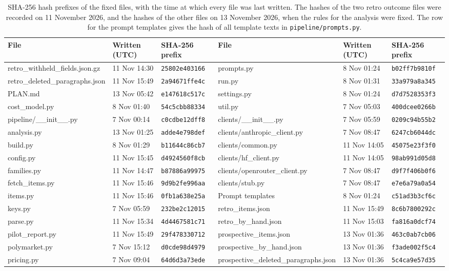 \documentclass[11pt]{article}
\begin{document}
\begin{table}[t]
\centering
\scriptsize
\setlength{\tabcolsep}{3pt}
\begin{tabular}{llllll}
\toprule
File & Written (UTC) & SHA-256 prefix & File & Written (UTC) & SHA-256 prefix \\
\midrule
retro\_withheld\_fields.json.gz & 11 Nov 14:30 & \texttt{25802e403166} & prompts.py & 8 Nov 01:24 & \texttt{b02ff7b9810f} \\
retro\_deleted\_paragraphs.json & 11 Nov 15:49 & \texttt{2a94671ffe4c} & run.py & 8 Nov 01:31 & \texttt{33a979a8a345} \\
PLAN.md & 13 Nov 05:42 & \texttt{e147618c517c} & settings.py & 8 Nov 01:24 & \texttt{d7d7528353f3} \\
cost\_model.py & 8 Nov 01:40 & \texttt{54c5cbb88334} & util.py & 7 Nov 05:03 & \texttt{400dcee0266b} \\
pipeline/\_\_init\_\_.py & 7 Nov 00:14 & \texttt{c0cdbe12dff8} & clients/\_\_init\_\_.py & 7 Nov 05:59 & \texttt{0209c94b55b2} \\
analysis.py & 13 Nov 01:25 & \texttt{adde4e798def} & clients/anthropic\_client.py & 7 Nov 08:47 & \texttt{6247cb6044dc} \\
build.py & 8 Nov 01:29 & \texttt{b11644c86cb7} & clients/common.py & 11 Nov 14:05 & \texttt{45075e23f3f0} \\
config.py & 11 Nov 15:45 & \texttt{d4924560f8cb} & clients/hf\_client.py & 11 Nov 14:05 & \texttt{98ab991d05d8} \\
families.py & 11 Nov 14:47 & \texttt{b87886a99975} & clients/openrouter\_client.py & 7 Nov 08:47 & \texttt{d9f7f406b0f6} \\
fetch\_items.py & 11 Nov 15:46 & \texttt{9d9b2fe996aa} & clients/stub.py & 7 Nov 08:47 & \texttt{e7e6a79a0a54} \\
items.py & 11 Nov 15:46 & \texttt{0fb1a638e25a} & Prompt templates & 8 Nov 01:24 & \texttt{c51ad3b3cf6c} \\
keys.py & 7 Nov 05:59 & \texttt{232be2c12015} & retro\_items.json & 11 Nov 15:49 & \texttt{8c6b7800292c} \\
parse.py & 11 Nov 15:34 & \texttt{4d4467581c71} & retro\_by\_hand.json & 11 Nov 15:03 & \texttt{fa816a0dcf74} \\
pilot\_report.py & 11 Nov 15:49 & \texttt{29f478330712} & prospective\_items.json & 13 Nov 01:36 & \texttt{463c0ab7cb06} \\
polymarket.py & 7 Nov 15:12 & \texttt{d0cde98d4979} & prospective\_by\_hand.json & 13 Nov 01:36 & \texttt{f3ade002f5c4} \\
pricing.py & 7 Nov 09:04 & \texttt{64d6d3a73ede} & prospective\_deleted\_paragraphs.json & 13 Nov 01:36 & \texttt{5c4ca9e57d35} \\
\bottomrule
\end{tabular}
\caption{SHA-256 hash prefixes of the fixed files, with the time at which every file was last written. The hashes of the two retro outcome files were recorded on 11 November 2026, and the hashes of the other files on 13 November 2026, when the rules for the analysis were fixed. The row for the prompt templates gives the hash of all template texts in \texttt{pipeline/prompts.py}.}
\label{tab:hashes}
\end{table}
\end{document}
